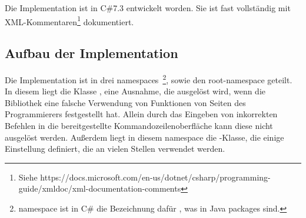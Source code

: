 Die Implementation ist in C\#7.3 entwickelt worden.
Sie ist fast vollständig mit XML-Kommentaren\footnote{Siehe https://docs.microsoft.com/en-us/dotnet/csharp/programming-guide/xmldoc/xml-documentation-comments} dokumentiert.
\subsection{Aufbau der Implementation}\label{subsec:Architecture}
Die Implementation ist in drei namespaces~\footnote{namespace ist in C\# die Bezeichnung dafür , was in Java packages sind.}, sowie den root-namespace geteilt.
In diesem liegt die Klasse , eine Ausnahme, die ausgelöst wird, wenn die Bibliothek eine falsche Verwendung von Funktionen von Seiten des Programmierers festgestellt hat.
Allein durch das Eingeben von inkorrekten Befehlen in die bereitgestellte Kommandozeilenoberfläche kann diese nicht ausgelöst werden.
Au\ss erdem liegt in diesem namespace die -Klasse, die einige Einstellung definiert, die an vielen Stellen verwendet werden.
